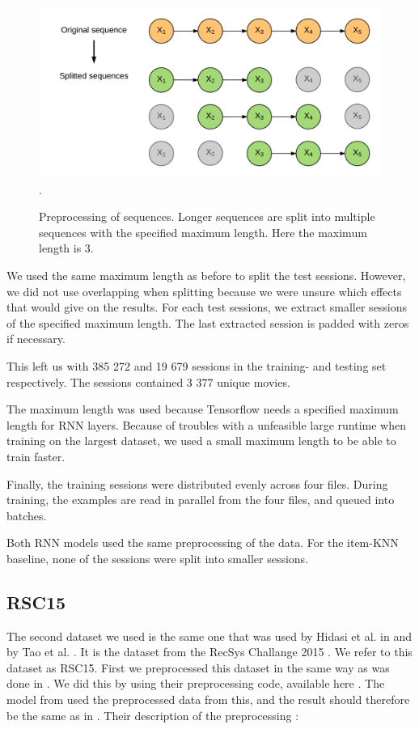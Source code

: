 \begin{figure}[htp]
	\centering
	\includegraphics[width=1.0\textwidth]{fig/data-sequence-split.png}.
	\caption{Preprocessing of sequences. Longer sequences are split into multiple sequences with the specified maximum length. Here the maximum length is 3.}
	\label{fig:data-sequence-split}
\end{figure}

We used the same maximum length as before to split the test sessions. However, we did not use overlapping when splitting because we were unsure which effects that would give on the results. For each test sessions, we extract smaller sessions of the specified maximum length. The last extracted session is padded with zeros if necessary.

This left us with 385 272 and 19 679 sessions in the training- and testing set respectively. The sessions contained 3 377 unique movies.

The maximum length was used because Tensorflow needs a specified maximum length for RNN layers. Because of troubles with a unfeasible large runtime when training on the largest dataset, we used a small maximum length to be able to train faster. 

Finally, the training sessions were distributed evenly across four files. During training, the examples are read in parallel from the four files, and queued into batches. 

Both RNN models used the same preprocessing of the data. For the item-KNN baseline, none of the sessions were split into smaller sessions.

\subsection{RSC15}
The second dataset we used is the same one that was used by Hidasi et al. in \cite{DBLP:journals/corr/HidasiKBT15} and by Tao et al. \cite{DBLP:journals/corr/TanXL16}. It is the dataset from the RecSys Challange 2015 \cite{dataset:recsys15}. We refer to this dataset as RSC15. First we preprocessed this dataset in the same way as was done in \cite{DBLP:journals/corr/HidasiKBT15}. We did this by using their preprocessing code, available here \cite{hidasi:code}. The model from \cite{DBLP:journals/corr/HidasiKBT15} used the preprocessed data from this, and the result should therefore be the same as in \cite{DBLP:journals/corr/HidasiKBT15}. Their description of the preprocessing \cite{DBLP:journals/corr/HidasiKBT15}:


